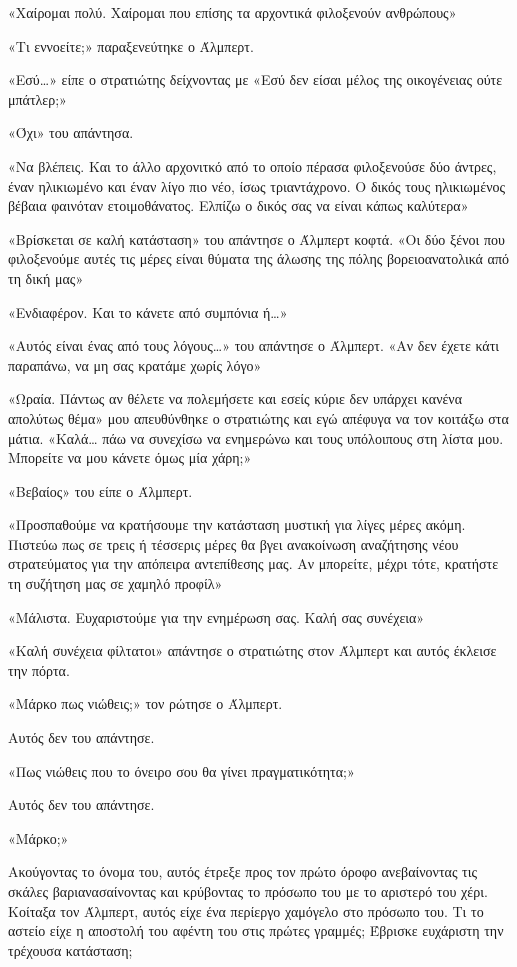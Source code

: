 \documentclass[12pt,twoside, openany]{book}
\begin{document}
«Χαίρομαι πολύ. Χαίρομαι που επίσης τα αρχοντικά φιλοξενούν ανθρώπους»

«Τι εννοείτε;» παραξενεύτηκε ο Άλμπερτ.

«Εσύ…» είπε ο στρατιώτης δείχνοντας με «Εσύ δεν είσαι μέλος της οικογένειας ούτε μπάτλερ;»

«Όχι» του απάντησα.

«Να βλέπεις. Και το άλλο αρχονιτκό από το οποίο πέρασα φιλοξενούσε δύο άντρες, έναν ηλικιωμένο και έναν λίγο πιο νέο, ίσως τριαντάχρονο. Ο δικός τους ηλικιωμένος βέβαια φαινόταν ετοιμοθάνατος. Ελπίζω ο δικός σας να είναι κάπως καλύτερα»

«Βρίσκεται σε καλή κατάσταση» του απάντησε ο Άλμπερτ κοφτά. «Οι δύο ξένοι που φιλοξενούμε αυτές τις μέρες είναι θύματα της άλωσης της πόλης βορειοανατολικά από τη δική μας»

«Ενδιαφέρον. Και το κάνετε από συμπόνια ή…»

«Αυτός είναι ένας από τους λόγους…» του απάντησε ο Άλμπερτ. «Αν δεν έχετε κάτι παραπάνω, να μη σας κρατάμε χωρίς λόγο»

«Ωραία. Πάντως αν θέλετε να πολεμήσετε και εσείς κύριε δεν υπάρχει κανένα απολύτως θέμα» μου απευθύνθηκε ο στρατιώτης και εγώ απέφυγα να τον κοιτάξω στα μάτια. «Καλά… πάω να συνεχίσω να ενημερώνω και τους υπόλοιπους στη λίστα μου. Μπορείτε να μου κάνετε όμως μία χάρη;»

«Βεβαίος» του είπε ο Άλμπερτ.

«Προσπαθούμε να κρατήσουμε την κατάσταση μυστική για λίγες μέρες ακόμη. Πιστεύω πως σε τρεις ή τέσσερις μέρες θα βγει ανακοίνωση αναζήτησης νέου στρατεύματος για την απόπειρα αντεπίθεσης μας. Αν μπορείτε, μέχρι τότε, κρατήστε τη συζήτηση μας σε χαμηλό προφίλ»

«Μάλιστα. Ευχαριστούμε για την ενημέρωση σας. Καλή σας συνέχεια»

«Καλή συνέχεια φίλτατοι» απάντησε ο στρατιώτης στον Άλμπερτ και αυτός έκλεισε την πόρτα.

«Μάρκο πως νιώθεις;» τον ρώτησε ο Άλμπερτ.

Αυτός δεν του απάντησε.

«Πως νιώθεις που το όνειρο σου θα γίνει πραγματικότητα;»

Αυτός δεν του απάντησε.

«Μάρκο;»

Ακούγοντας το όνομα του, αυτός έτρεξε προς τον πρώτο όροφο ανεβαίνοντας τις σκάλες βαριανασαίνοντας και κρύβοντας το πρόσωπο του με το αριστερό του χέρι. Κοίταξα τον Άλμπερτ, αυτός είχε ένα περίεργο χαμόγελο στο πρόσωπο του. Τι το αστείο είχε η αποστολή του αφέντη του στις πρώτες γραμμές; Έβρισκε ευχάριστη την τρέχουσα κατάσταση;
\end{document}
